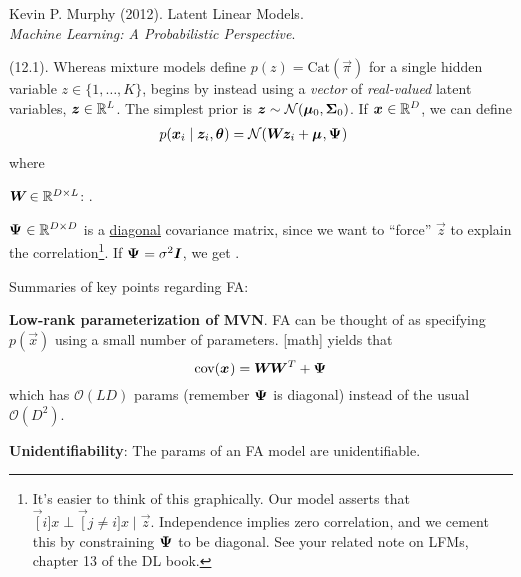 \documentclass[11pt]{article}
\begin{document}

\vspace{-1.7em}
{\scriptsize Kevin P. Murphy (2012). Latent Linear Models.\\ \textit{Machine Learning: A Probabilistic Perspective}.\\ }

\p {} (12.1). Whereas mixture models define $p(z) = \text{Cat}(\vec\pi)$ for a single hidden variable $z \in \{1, \ldots, K\}$,  begins by instead using a \textit{vector} of \textit{real-valued} latent variables, $\vec z \in \R^{L}$. The simplest prior is $\vec z \sim \mathcal{N}(\vec[0]{\mu}, \matr[0]{\Sigma})$. If $\vec x \in \R^D$, we can define
\begin{align}
	p(\vec[i]{x}\mid \vec[i]{z}, \vec\theta)
		&= \mathcal{N}(\matr W \vec[i]{z} + \vec\mu, \matr\Psi)
\end{align}
where
\begin{compactitem}
	\item $\matr W \in \R^{D \times L}$: .
	
	\item $\matr\Psi \in \R^{D \times D}$ is a \underline{diagonal} covariance matrix, since we want to ``force'' $\vec{z}$ to explain the correlation\footnote{It's easier to think of this graphically. Our model asserts that $\vec[i]{x} \perp \vec[j\ne i]{x} \mid \vec{z}$. Independence implies zero correlation, and we cement this by constraining $\matr\Psi$ to be diagonal. See your related note on LFMs, chapter 13 of the DL book.}. If $\matr\Psi  = \sigma^2 \matr I$, we get . 
\end{compactitem}
Summaries of key points regarding FA:
\begin{compactitem}
	\item \textbf{Low-rank parameterization of MVN}. FA can be thought of as specifying $p(\vec x)$ using a small number of parameters. [math] yields that
	$$
	\text{cov}(\vec x) = \matr W \matr{W}^T + \matr\Psi
	$$
	which has $\mathcal{O}(LD)$ params (remember $\matr\Psi$ is diagonal) instead of the usual $\mathcal{O}(D^2)$. 
	
	\item \textbf{Unidentifiability}: The params of an FA model are unidentifiable. 
\end{compactitem}
\end{document}
